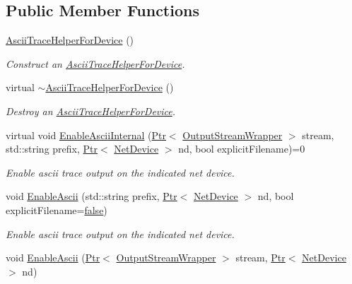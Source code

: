 \subsection*{Public Member Functions}
\begin{DoxyCompactItemize}
\item 
\hyperlink{classns3_1_1AsciiTraceHelperForDevice_aa4877e8170e37af530a13a19c0fcd0d3}{Ascii\+Trace\+Helper\+For\+Device} ()
\begin{DoxyCompactList}\small\item\em Construct an \hyperlink{classns3_1_1AsciiTraceHelperForDevice}{Ascii\+Trace\+Helper\+For\+Device}. \end{DoxyCompactList}\item 
virtual \hyperlink{classns3_1_1AsciiTraceHelperForDevice_a0080827462fb3e49e57a8d2b5c6bd786}{$\sim$\+Ascii\+Trace\+Helper\+For\+Device} ()
\begin{DoxyCompactList}\small\item\em Destroy an \hyperlink{classns3_1_1AsciiTraceHelperForDevice}{Ascii\+Trace\+Helper\+For\+Device}. \end{DoxyCompactList}\item 
virtual void \hyperlink{classns3_1_1AsciiTraceHelperForDevice_ab0eb42de1633994e75f4a4fd44bc79de}{Enable\+Ascii\+Internal} (\hyperlink{classns3_1_1Ptr}{Ptr}$<$ \hyperlink{classns3_1_1OutputStreamWrapper}{Output\+Stream\+Wrapper} $>$ stream, std\+::string prefix, \hyperlink{classns3_1_1Ptr}{Ptr}$<$ \hyperlink{classns3_1_1NetDevice}{Net\+Device} $>$ nd, bool explicit\+Filename)=0
\begin{DoxyCompactList}\small\item\em Enable ascii trace output on the indicated net device. \end{DoxyCompactList}\item 
void \hyperlink{classns3_1_1AsciiTraceHelperForDevice_a3101b30e635f717bddf0e5764912fec1}{Enable\+Ascii} (std\+::string prefix, \hyperlink{classns3_1_1Ptr}{Ptr}$<$ \hyperlink{classns3_1_1NetDevice}{Net\+Device} $>$ nd, bool explicit\+Filename=\hyperlink{lte__cqi__generation_8m_ab1bef239d413c4da139c4bac92cd657a}{false})
\begin{DoxyCompactList}\small\item\em Enable ascii trace output on the indicated net device. \end{DoxyCompactList}\item 
void \hyperlink{classns3_1_1AsciiTraceHelperForDevice_ae7fd7fa637f1a8f6e225e891d50b1ba3}{Enable\+Ascii} (\hyperlink{classns3_1_1Ptr}{Ptr}$<$ \hyperlink{classns3_1_1OutputStreamWrapper}{Output\+Stream\+Wrapper} $>$ stream, \hyperlink{classns3_1_1Ptr}{Ptr}$<$ \hyperlink{classns3_1_1NetDevice}{Net\+Device} $>$ nd)

\end{DoxyCompactItemize}
